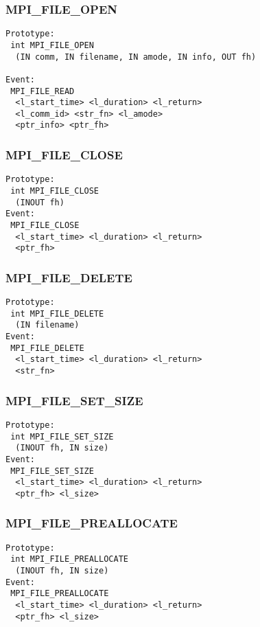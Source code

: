 \documentclass{article}
\begin{document}
\subsubsection{MPI\_FILE\_OPEN}
\label{sec:MPIFILEOPEN}
\begin{verbatim}
Prototype: 
 int MPI_FILE_OPEN
  (IN comm, IN filename, IN amode, IN info, OUT fh)

Event: 
 MPI_FILE_READ 
  <l_start_time> <l_duration> <l_return> 
  <l_comm_id> <str_fn> <l_amode> 
  <ptr_info> <ptr_fh>
\end{verbatim}

\subsubsection{MPI\_FILE\_CLOSE}
\label{sec:MPIFILECLOSE}
\begin{verbatim}
Prototype: 
 int MPI_FILE_CLOSE
  (INOUT fh)
Event: 
 MPI_FILE_CLOSE 
  <l_start_time> <l_duration> <l_return> 
  <ptr_fh>
\end{verbatim}

\subsubsection{MPI\_FILE\_DELETE}
\label{sec:MPIFILEDELETE}
\begin{verbatim}
Prototype: 
 int MPI_FILE_DELETE
  (IN filename)
Event: 
 MPI_FILE_DELETE 
  <l_start_time> <l_duration> <l_return>
  <str_fn>
\end{verbatim}

\subsubsection{MPI\_FILE\_SET\_SIZE}
\label{sec:MPIFILESETSIZE}
\begin{verbatim}
Prototype: 
 int MPI_FILE_SET_SIZE
  (INOUT fh, IN size)
Event: 
 MPI_FILE_SET_SIZE 
  <l_start_time> <l_duration> <l_return>
  <ptr_fh> <l_size>
\end{verbatim}

\subsubsection{MPI\_FILE\_PREALLOCATE}
\label{sec:MPIFILEPREALLOCATE}
\begin{verbatim}
Prototype: 
 int MPI_FILE_PREALLOCATE
  (INOUT fh, IN size)
Event: 
 MPI_FILE_PREALLOCATE 
  <l_start_time> <l_duration> <l_return>
  <ptr_fh> <l_size>
\end{verbatim}
\end{document}
